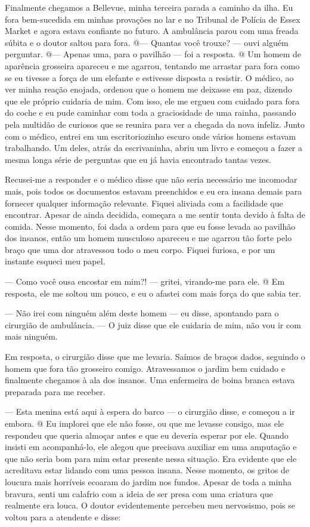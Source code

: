 Finalmente chegamos a Bellevue, minha terceira parada a caminho da ilha.
Eu fora bem-sucedida em minhas provações no lar e no Tribunal de Polícia
de Essex Market e agora estava confiante no futuro. A ambulância parou
com uma freada súbita e o doutor saltou para fora. @--- Quantas você
trouxe? --- ouvi alguém perguntar. @--- Apenas uma, para o pavilhão ---
foi a resposta. @ Um homem de aparência grosseira apareceu e me agarrou,
tentando me arrastar para fora como se eu tivesse a força de um elefante
e estivesse disposta a resistir. O médico, ao ver minha reação enojada,
ordenou que o homem me deixasse em paz, dizendo que ele próprio cuidaria
de mim. Com isso, ele me ergueu com cuidado para fora do coche e eu pude
caminhar com toda a graciosidade de uma rainha, passando pela multidão
de curiosos que se reunira para ver a chegada da nova infeliz. Junto com
o médico, entrei em um escritoriozinho escuro onde vários homens estavam
trabalhando. Um deles, atrás da escrivaninha, abriu um livro e começou a
fazer a mesma longa série de perguntas que eu já havia encontrado tantas
vezes.

Recusei-me a responder e o médico disse que não seria necessário me
incomodar mais, pois todos os documentos estavam preenchidos e eu era
insana demais para fornecer qualquer informação relevante. Fiquei
aliviada com a facilidade que encontrar. Apesar de ainda decidida,
começara a me sentir tonta devido à falta de comida. Nesse momento, foi
dada a ordem para que eu fosse levada ao pavilhão dos insanos, então um
homem musculoso apareceu e me agarrou tão forte pelo braço que uma dor
atravessou todo o meu corpo. Fiquei furiosa, e por um instante esqueci
meu papel.

--- Como você ousa encostar em mim?! --- gritei, virando-me para ele. @
Em resposta, ele me soltou um pouco, e eu o afastei com mais força do
que sabia ter.

--- Não irei com ninguém além deste homem --- eu disse, apontando para o
cirurgião de ambulância. --- O juiz disse que ele cuidaria de mim, não
vou ir com mais ninguém.

Em resposta, o cirurgião disse que me levaria. Saímos de braços dados,
seguindo o homem que fora tão grosseiro comigo. Atravessamos o jardim
bem cuidado e finalmente chegamos à ala dos insanos. Uma enfermeira de
boina branca estava preparada para me receber.

--- Esta menina está aqui à espera do barco --- o cirurgião disse, e
começou a ir embora. @ Eu implorei que ele não fosse, ou que me levasse
consigo, mas ele respondeu que queria almoçar antes e que eu deveria
esperar por ele. Quando insisti em acompanhá-lo, ele alegou que
precisava auxiliar em uma amputação e que não seria bom para mim estar
presente nessa situação. Era evidente que ele acreditava estar lidando
com uma pessoa insana. Nesse momento, os gritos de loucura mais
horríveis ecoaram do jardim nos fundos. Apesar de toda a minha bravura,
senti um calafrio com a ideia de ser presa com uma criatura que
realmente era louca. O doutor evidentemente percebeu meu nervosismo,
pois se voltou para a atendente e disse:

